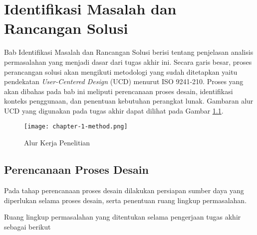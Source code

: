 \newcommand{\ccnormspacing}{\baselineskip=12pt}
\newcommand{\ccnormspacingcenter}{\centering\arraybackslash\ccnormspacing}


\chapter{Identifikasi Masalah dan Rancangan Solusi}


Bab Identifikasi Masalah dan Rancangan Solusi berisi tentang penjelasan analisis permasalahan yang menjadi dasar dari tugas akhir ini. Secara garis besar, proses perancangan solusi akan mengikuti metodologi yang sudah ditetapkan yaitu pendekatan \textit{User-Centered Design} (UCD) menurut ISO 9241-210. Proses yang akan dibahas pada bab ini meliputi perencanaan proses desain, identifikasi konteks penggunaan, dan penentuan kebutuhan perangkat lunak. Gambaran alur UCD yang digunakan pada tugas akhir dapat dilihat pada Gambar \ref{fig:diagram_alur_kerja}.

\begin{figure}[h]
  \centering
  \texttt{[image: chapter-1-method.png]}
  \caption{Alur Kerja Penelitian}
  \label{fig:diagram_alur_kerja}
\end{figure}

\section{Perencanaan Proses Desain}
\label{sec:perencanaan_proses_desain}

Pada tahap perencanaan proses desain dilakukan persiapan sumber daya yang diperlukan selama proses desain, serta penentuan ruang lingkup permasalahan.


Ruang lingkup permasalahan yang ditentukan selama pengerjaan tugas akhir sebagai berikut

